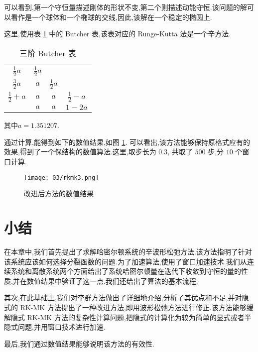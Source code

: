 可以看到,第一个守恒量描述刚体的形状不变,第二个则描述动能守恒.该问题的解可以看作是一个球体和一个椭球的交线,因此,该解在一个稳定的椭圆上.

这里,使用表 \ref{tbl:04rk3} 中的 Butcher 表,该表对应的 Runge-Kutta 法是一个辛方法.

\begin{table}[h!]
  \centering
  \caption{三阶 Butcher 表}
  \label{tbl:04rk3}
  \begin{tabular}{c|ccc}
    $\frac{1}{2}a$ & $\frac{1}{2}a$ & & \\
    $\frac{3}{2}a$ & $a$ &$\frac{1}{2}a$  & \\
    $\frac{1}{2} + a$ & $a$ & $a$ &$\frac{1}{2}-a$\\
    \hline
    & $a$ &$a$ & $1-2a$\\
  \end{tabular}
\end{table}
其中$a = 1.351207$.

通过计算,能得到如下的数值结果,如图 \ref{fig:rkmk3}. 可以看出,该方法能够保持原格式应有的效果,得到了一个保结构的数值算法.这里,取步长为 $0.3$, 共取了 $500$ 步,分 $10$ 个窗口计算.

\begin{figure}[h!]
  \centering
  \texttt{[image: 03/rkmk3.png]}
  \caption{改进后方法的数值结果}
  \label{fig:rkmk3}
\end{figure}

 \section{小结}\label{sec:03conclusion}
在本章中,我们首先提出了求解哈密尔顿系统的辛波形松弛方法.该方法指明了针对该系统应该如何选择分裂函数的问题.为了加速算法,使用了窗口加速技术.我们从连续系统和离散系统两个方面给出了系统哈密尔顿量在迭代下收敛到守恒的量的性质,并在数值结果中验证了这一点.我们还给出了算法的基本流程.

其次,在此基础上,我们对李群方法做出了详细地介绍,分析了其优点和不足,并对隐式的 RK-MK 方法提出了一种改进方法,即用波形松弛方法进行修正.该方法能够缓解隐式 RK-MK 方法的复杂性计算问题,把隐式的计算化为较为简单的显式或者半隐式问题,并用窗口技术进行加速.

最后,我们通过数值结果能够说明该方法的有效性.
